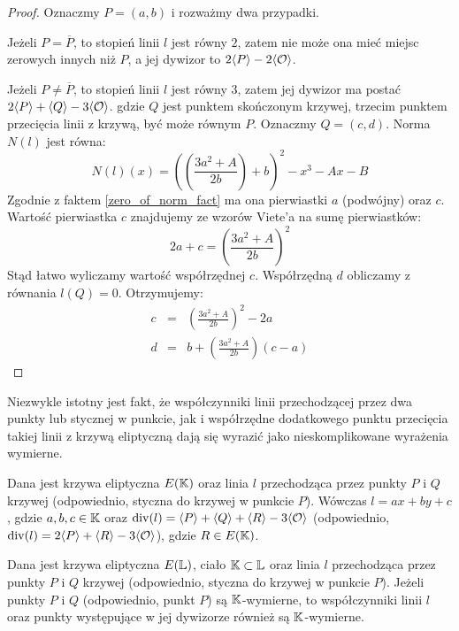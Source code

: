 \begin{proof}
Oznaczmy $P = (a, b)$
i rozważmy dwa przypadki.

Jeżeli $P = \overline{P}$,
to stopień linii $l$ jest równy $2$,
zatem nie może ona mieć miejsc zerowych innych niż $P$,
a jej dywizor to $2\langle P\rangle - 2\langle\mathcal{O}\rangle$.

Jeżeli $P \neq \overline{P}$,
to stopień linii $l$ jest równy $3$,
zatem jej dywizor ma postać
$2\langle P\rangle+ \langle Q\rangle - 3\langle\mathcal{O}\rangle$.
gdzie $Q$ jest punktem skończonym krzywej,
trzecim punktem przecięcia linii z krzywą,
być może równym $P$.
Oznaczmy $Q = (c, d)$.
Norma $N(l)$ jest równa:
\begin{equation*}
N(l)(x) = \left(\left(\frac{3a^2+A}{2b}\right) + b\right)^2 - x^3 - Ax - B
\end{equation*}
Zgodnie z faktem \ref{zero_of_norm_fact}
ma ona pierwiastki $a$ (podwójny) oraz $c$.
Wartość pierwiastka $c$ znajdujemy ze wzorów Viete'a na sumę pierwiastków:
\begin{equation*}
2a + c = \left(\frac{3a^2+A}{2b}\right)^2
\end{equation*}
Stąd łatwo wyliczamy wartość współrzędnej $c$.
Współrzędną $d$ obliczamy z równania $l(Q) = 0$.
Otrzymujemy:
\begin{eqnarray}
\label{tangent_line_third_point_x_eqn}
c & = & \left(\frac{3a^2+A}{2b}\right)^2 - 2a \\
\label{tangent_line_third_point_y_eqn}
d & = & b + \left(\frac{3a^2+A}{2b}\right)(c-a)
\end{eqnarray}
\end{proof}

Niezwykle istotny jest fakt,
że współczynniki linii przechodzącej przez dwa punkty
lub stycznej w punkcie,
jak i współrzędne dodatkowego punktu przecięcia
takiej linii z krzywą eliptyczną dają się wyrazić
jako nieskomplikowane wyrażenia wymierne.

\begin{fact}
Dana jest krzywa eliptyczna $E(\mathbb{K})$
oraz linia $l$ przechodząca przez punkty $P$ i $Q$ krzywej
(odpowiednio, styczna do krzywej w punkcie $P$).
Wówczas $l = ax + by + c$, gdzie $a,b,c \in \mathbb{K}$
oraz $\operatorname{div}(l) = \langle P\rangle + \langle Q\rangle + \langle R\rangle - 3\langle\mathcal{O}\rangle$
(odpowiednio, $\operatorname{div}(l) = 2\langle P\rangle + \langle R\rangle - 3\langle\mathcal{O}\rangle$),
gdzie $R \in E(\mathbb{K})$.
\end{fact}

\begin{fact}
Dana jest krzywa eliptyczna $E(\mathbb{L})$, ciało $\mathbb{K} \subset \mathbb{L}$
oraz linia $l$ przechodząca przez punkty $P$ i $Q$ krzywej
(odpowiednio, styczna do krzywej w punkcie $P$).
Jeżeli punkty $P$ i $Q$ (odpowiednio, punkt $P$) są $\mathbb{K}$-wymierne,
to współczynniki linii $l$
oraz punkty występujące w jej dywizorze
również są $\mathbb{K}$-wymierne.
\end{fact}

